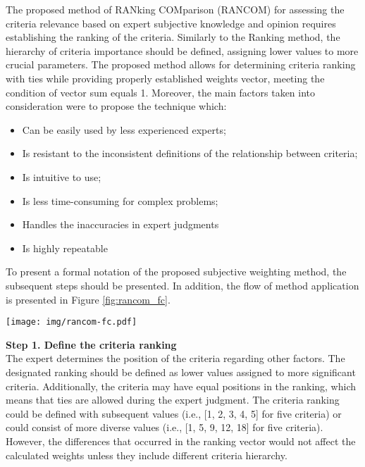 
The proposed method of RANking COMparison (RANCOM) for assessing the criteria relevance based on expert subjective knowledge and opinion requires establishing the ranking of the criteria. Similarly to the Ranking method, the hierarchy of criteria importance should be defined, assigning lower values to more crucial parameters. The proposed method allows for determining criteria ranking with ties while providing properly established weights vector, meeting the condition of vector sum equals 1. Moreover, the main factors taken into consideration were to propose the technique which:

\begin{itemize}
    \item Can be easily used by less experienced experts;
    \item Is resistant to the inconsistent definitions of the relationship between criteria;
    \item Is intuitive to use;
    \item Is less time-consuming for complex problems;
    \item Handles the inaccuracies in expert judgments
    \item Is highly repeatable
\end{itemize}

To present a formal notation of the proposed subjective weighting method, the subsequent steps should be presented. In addition, the flow of method application is presented in Figure \ref{fig:rancom_fc}. \\

\begin{figure*}[h!]
	\centerline{
    	\texttt{[image: img/rancom-fc.pdf]}
	}
	\caption{Flowchart of the subsequent steps in the RANCOM method.}
	\label{fig:rancom_fc}
\end{figure*}

\noindent \textbf{Step 1. Define the criteria ranking} \\

The expert determines the position of the criteria regarding other factors. The designated ranking should be defined as lower values assigned to more significant criteria. Additionally, the criteria may have equal positions in the ranking, which means that ties are allowed during the expert judgment. The criteria ranking could be defined with subsequent values (i.e., [1, 2, 3, 4, 5] for five criteria) or could consist of more diverse values (i.e., [1, 5, 9, 12, 18] for five criteria). However, the differences that occurred in the ranking vector would not affect the calculated weights unless they include different criteria hierarchy. \\

